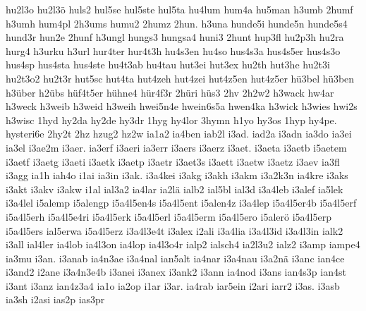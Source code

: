 {    hu2l3o
    hu2l3ö
    huls2
    hul5se
    hul5ste
    hul5ta
    hu4lum
    hum4a
    hu5man
    h3umb
    2humf
    h3umh
    hum4pl
    2h3ums
    humu2
    2humz
    2hun.
    h3una
    hunde5i
    hunde5n
    hunde5s4
    hund3r
    hun2e
    2hunf
    h3ungl
    hungs3
    hungsa4
    huni3
    2hunt
    hup3fl
    hu2p3h
    hu2ra
    hurg4
    h3urku
    h3url
    hur4ter
    hur4t3h
    hu4s3en
    hu4so
    hus4s3a
    hus4s5er
    hus4s3o
    hus4sp
    hus4sta
    hus4ste
    hu4t3ab
    hu4tau
    hut3ei
    hut3ex
    hu2th
    hut3he
    hu2t3i
    hu2t3o2
    hu2t3r
    hut5sc
    hut4ta
    hut4zeh
    hut4zei
    hut4z5en
    hut4z5er
    hü3bel
    hü3ben
    h3über
    h2übs
    hüf4t5er
    hühne4
    hür4f3r
    2hüri
    hüs3
    2hv
    2h2w2
    h3wack
    hw4ar
    h3weck
    h3weib
    h3weid
    h3weih
    hwei5n4e
    hwein6s5a
    hwen4ka
    h3wick
    h3wies
    hwi2s
    h3wisc
    1hyd
    hy2da
    hy2de
    hy3dr
    1hyg
    hy4lor
    3hymn
    h1yo
    hy3os
    1hyp
    hy4pe.
    hysteri6e
    2hy2t
    2hz
    hzug2
    hz2w
    ia1a2
    ia4ben
    iab2l
    i3ad.
    iad2a
    i3adn
    ia3do
    ia3ei
    ia3el
    i3ae2m
    i3aer.
    ia3erf
    i3aeri
    ia3err
    i3aers
    i3aerz
    i3aet.
    i3aeta
    i3aetb
    i5aetem
    i3aetf
    i3aetg
    i3aeti
    i3aetk
    i3aetp
    i3aetr
    i3aet3s
    i3aett
    i3aetw
    i3aetz
    i3aev
    ia3fl
    i3agg
    ia1h
    iah4o
    i1ai
    ia3in
    i3ak.
    i3a4kei
    i3akg
    i3akh
    i3akm
    i3a2k3n
    ia4kre
    i3aks
    i3akt
    i3akv
    i3akw
    i1al
    ial3a2
    ia4lar
    ia2lä
    ialb2
    ial5bl
    ial3d
    i3a4leb
    i3alef
    ia5lek
    i3a4lel
    i5alemp
    i5alengp
    i5a4l5en4s
    i5a4l5ent
    i5alen4z
    i3a4lep
    i5a4l5er4b
    i5a4l5erf
    i5a4l5erh
    i5a4l5e4ri
    i5a4l5erk
    i5a4l5erl
    i5a4l5erm
    i5a4l5ero
    i5alerö
    i5a4l5erp
    i5a4l5ers
    ial5erwa
    i5a4l5erz
    i3a4l3e4t
    i3alex
    i2ali
    i3a4lia
    i3a4l3id
    i3a4l3in
    ialk2
    i3all
    ial4ler
    ia4lob
    ia4l3on
    ia4lop
    ia4l3o4r
    ialp2
    ialsch4
    ia2l3u2
    ialz2
    i3amp
    iampe4
    ia3mu
    i3an.
    i3anab
    ia4n3ae
    i3a4nal
    ian5alt
    ia4nar
    i3a4nau
    i3a2nä
    i3anc
    ian4ce
    i3and2
    i2ane
    i3a4n3e4b
    i3anei
    i3anex
    i3ank2
    i3ann
    ia4nod
    i3ans
    ian4s3p
    ian4st
    i3ant
    i3anz
    ian4z3a4
    ia1o
    ia2op
    i1ar
    i3ar.
    ia4rab
    iar5ein
    i2ari
    iarr2
    i3as.
    i3asb
    ia3sh
    i2asi
    ias2p
    ias3pr
}
